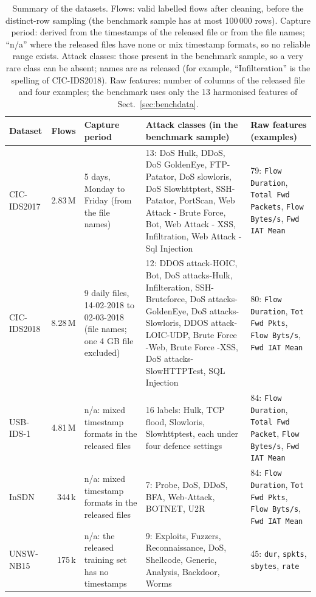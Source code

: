 \documentclass[pdflatex,sn-mathphys-num]{sn-jnl}%
\begin{document}
\begin{table}[htbp]
\centering\scriptsize
\caption{Summary of the datasets. Flows: valid labelled flows after cleaning, before the distinct-row sampling (the benchmark sample has at most 100\,000 rows). Capture period: derived from the timestamps of the released file or from the file names; ``n/a'' where the released files have none or mix timestamp formats, so no reliable range exists. Attack classes: those present in the benchmark sample, so a very rare class can be absent; names are as released (for example, ``Infilteration'' is the spelling of CIC-IDS2018). Raw features: number of columns of the released file and four examples; the benchmark uses only the 13 harmonised features of Sect.~\ref{sec:benchdata}.}\label{tab:datasummary}
{\scriptsize\setlength{\tabcolsep}{2.5pt}\begin{tabular}{p{}rp{}p{}p{}}
\toprule
Dataset & Flows & Capture period & Attack classes (in the benchmark sample) & Raw features (examples) \\
\midrule
CIC-IDS2017 & 2.83\,M & 5 days, Monday to Friday (from the file names) & 13: DoS Hulk, DDoS, DoS GoldenEye, FTP-Patator, DoS slowloris, DoS Slowhttptest, SSH-Patator, PortScan, Web Attack - Brute Force, Bot, Web Attack - XSS, Infiltration, Web Attack - Sql Injection & 79: \texttt{Flow Duration}, \texttt{Total Fwd Packets}, \texttt{Flow Bytes/s}, \texttt{Fwd IAT Mean} \\
CIC-IDS2018 & 8.28\,M & 9 daily files, 14-02-2018 to 02-03-2018 (file names; one 4 GB file excluded) & 12: DDOS attack-HOIC, Bot, DoS attacks-Hulk, Infilteration, SSH-Bruteforce, DoS attacks-GoldenEye, DoS attacks-Slowloris, DDOS attack-LOIC-UDP, Brute Force -Web, Brute Force -XSS, DoS attacks-SlowHTTPTest, SQL Injection & 80: \texttt{Flow Duration}, \texttt{Tot Fwd Pkts}, \texttt{Flow Byts/s}, \texttt{Fwd IAT Mean} \\
USB-IDS-1 & 4.81\,M & n/a: mixed timestamp formats in the released files & 16 labels: Hulk, TCP flood, Slowloris, Slowhttptest, each under four defence settings & 84: \texttt{Flow Duration}, \texttt{Total Fwd Packet}, \texttt{Flow Bytes/s}, \texttt{Fwd IAT Mean} \\
InSDN & 344\,k & n/a: mixed timestamp formats in the released files & 7: Probe, DoS, DDoS, BFA, Web-Attack, BOTNET, U2R & 84: \texttt{Flow Duration}, \texttt{Tot Fwd Pkts}, \texttt{Flow Byts/s}, \texttt{Fwd IAT Mean} \\
UNSW-NB15 & 175\,k & n/a: the released training set has no timestamps & 9: Exploits, Fuzzers, Reconnaissance, DoS, Shellcode, Generic, Analysis, Backdoor, Worms & 45: \texttt{dur}, \texttt{spkts}, \texttt{sbytes}, \texttt{rate} \\

\end{tabular}}
\end{table}
\end{document}
